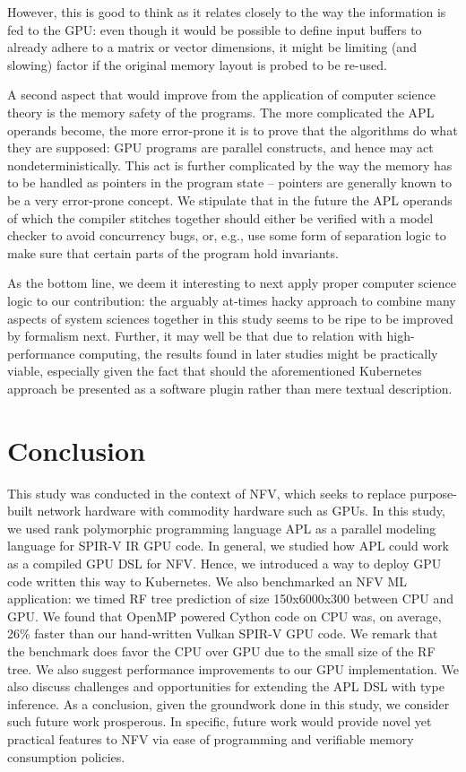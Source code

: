 \documentclass{IEEEtran}
\begin{document}
However, this is good to think as it relates closely to the way the information is fed to the GPU: even though it would be possible to define input buffers to already adhere to a matrix or vector dimensions, it might be limiting (and slowing) factor if the original memory layout is probed to be re-used.

A second aspect that would improve from the application of computer science theory is the memory safety of the programs. The more complicated the APL operands become, the more error-prone it is to prove that the algorithms do what they are supposed: GPU programs are parallel constructs, and hence may act nondeterministically. This act is further complicated by the way the memory has to be handled as pointers in the program state -- pointers are generally known to be a very error-prone concept. We stipulate that in the future the APL operands of which the compiler stitches together should either be verified with a model checker to avoid concurrency bugs, or, e.g., use some form of separation logic to make sure that certain parts of the program hold invariants.

As the bottom line, we deem it interesting to next apply proper computer science logic to our contribution: the arguably at-times hacky approach to combine many aspects of system sciences together in this study seems to be ripe to be improved by formalism next. Further, it may well be that due to relation with high-performance computing, the results found in later studies might be practically viable, especially given the fact that should the aforementioned Kubernetes approach be presented as a software plugin rather than mere textual description.

\section{Conclusion}
\label{ch:conclusion}

This study was conducted in the context of NFV, which seeks to replace purpose-built network hardware with commodity hardware such as GPUs. In this study, we used rank polymorphic programming language APL as a parallel modeling language for SPIR-V IR GPU code. In general, we studied how APL could work as a compiled GPU DSL for NFV. Hence, we introduced a way to deploy GPU code written this way to Kubernetes. We also benchmarked an NFV ML application: we timed RF tree prediction of size 150x6000x300 between CPU and GPU. We found that OpenMP powered Cython code on CPU was, on average, 26\% faster than our hand-written Vulkan SPIR-V GPU code. We remark that the benchmark does favor the CPU over GPU due to the small size of the RF tree. We also suggest performance improvements to our GPU implementation. We also discuss challenges and opportunities for extending the APL DSL with type inference. As a conclusion, given the groundwork done in this study, we consider such future work prosperous. In specific, future work would provide novel yet practical features to NFV via ease of programming and verifiable memory consumption policies.
\end{document}
